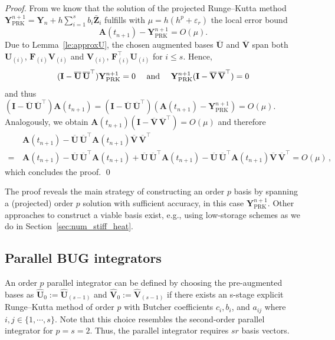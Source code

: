 \documentclass[preprint,runningheads]{svjour3}
\def\eps{\varepsilon}
\def\wh{\widehat}
\def\wt{\widetilde}
\def\wt{\overline}
\newcommand\bfI{{\mathbf I}}
\newcommand\bfA{{\mathbf A}}
\newcommand\bfF{{\mathbf F}}
\newcommand\bfU{{\mathbf U}}
\newcommand\bfV{{\mathbf V}}
\newcommand\bfY{{\mathbf Y}}
\newcommand\bfZ{{\mathbf Z}}
\def\eps{\varepsilon}
\begin{document}
\begin{proof}
From \cite[Theorem~6]{KiV19} we know that the solution of the projected Runge--Kutta method $\bfY^{n+1}_{\mathrm{PRK}} = \bfY_n + h\sum_{i=1}^s b_i \bar \bfZ_i$ fulfills with $\mu=h(h^p+\eps_r)$ the local error bound
$$ 
\bfA(t_{n+1})-\bfY^{n+1}_{\mathrm{PRK}} = O(\mu).
$$
Due to Lemma~\ref{le:approxU}, the chosen augmented bases $\wt \bfU$ and $\wt \bfV$ span both $\bfU_{(i)}$, $\bfF_{(i)}\bfV_{(i)}$ and $\bfV_{(i)}$, $\bfF_{(i)}^\top\bfU_{(i)}$ for $i\leq s$. Hence,
$$
(\bfI-\wt \bfU \, \wt \bfU^\top) \bfY^{n+1}_{\mathrm{PRK}} = 0 \quad\hbox{ and }\quad 
\bfY^{n+1}_{\mathrm{PRK}} (\bfI-\wt \bfV \,\wt \bfV^\top) =0
$$
and thus $(\bfI-\wt \bfU \, \wt \bfU^\top)\bfA(t_{n+1}) =  (\bfI-\wt \bfU \, \wt \bfU^\top)(\bfA(t_{n+1})-\bfY^{n+1}_{\mathrm{PRK}}) = O(\mu)$. Analogously, we obtain $\bfA(t_{n+1})(\bfI-\wt \bfV \, \wt \bfV^\top) = O(\mu)$ and therefore
\begin{align*}
    \,&\bfA(t_{n+1}) - \wt \bfU \,\wt \bfU^\top \bfA(t_{n+1}) \wt \bfV\, \wt \bfV^\top\\
=\,& \bfA(t_{n+1}) - \wt \bfU \,\wt \bfU^\top \bfA(t_{n+1}) + \wt \bfU \,\wt \bfU^\top \bfA(t_{n+1}) - \wt \bfU \,\wt \bfU^\top \bfA(t_{n+1}) \wt \bfV\, \wt \bfV^\top = O(\mu)\,,
\end{align*}
which concludes the proof. \qed
\end{proof}
{
\begin{remark}
    The proof reveals the main strategy of constructing an order $p$ basis by spanning a (projected) order $p$ solution with sufficient accuracy, in this case $\bfY^{n+1}_{\mathrm{PRK}}$. Other approaches to construct a viable basis exist, e.g., using low-storage schemes as we do in Section~\ref{sec:num_stiff_heat}.
\end{remark}
}

\subsection{Parallel BUG integrators}
An order $p$ parallel integrator can be defined by choosing the pre-augmented bases as $\widehat \bfU_0 := \wh \bfU_{(s-1)}$ and $\wh \bfV_0 := \widehat \bfV_{(s-1)}$ if there exists an s-stage explicit Runge--Kutta method of order $p$ with Butcher coefficients $c_i, b_i$, and $a_{ij}$ where $i,j\in\{1,\cdots, s\}$. Note that this choice resembles the second-order parallel integrator \cite{kusch2024second} for $p = s = 2$. Thus, the parallel integrator requires $sr$ basis vectors.
\end{document}
